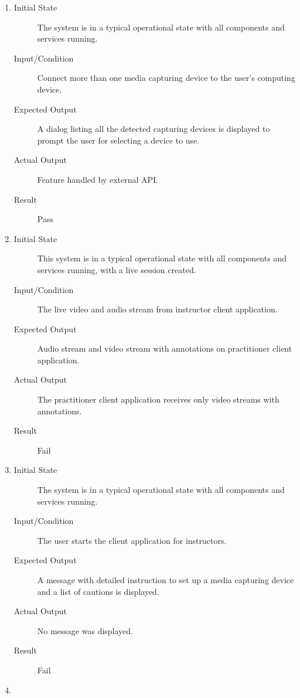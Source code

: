 \documentclass[12pt, titlepage]{article}
\begin{document}
\begin{enumerate}[NFR-T1]
  \item \label{NFRT13}
    \begin{description}
    \item[Initial State] The system is in a typical operational state with all
      components and services running.
    \item[Input/Condition] Connect more than one media capturing device to the
      user’s computing device.
    \item[Expected Output] A dialog listing all the detected capturing devices is
      displayed to prompt the user for selecting a device to use.
    \item[Actual Output] Feature handled by external API.
    \item[Result] Pass
    \end{description}
  \item \label{NFRT14}
    \begin{description}
    \item[Initial State] This system is in a typical operational state with all
      components and services running, with a live session created.
    \item[Input/Condition] The live video and audio stream from instructor client
      application.
    \item[Expected Output] Audio stream and video stream with annotations on
      practitioner client application.
    \item[Actual Output] The practitioner client application receives only video
      streams with annotations.
    \item[Result] Fail
    \end{description}
  \item \label{NFRT15}
    \begin{description}
    \item[Initial State] The system is in a typical operational state with all
      components and services running.
    \item[Input/Condition] The user starts the client application for instructors.
    \item[Expected Output] A message with detailed instruction to set up a media
      capturing device and a list of cautions is displayed.
    \item[Actual Output] No message was displayed.
    \item[Result] Fail
    \end{description}
  \item \label{NFRT16}

\end{enumerate}
\end{document}
